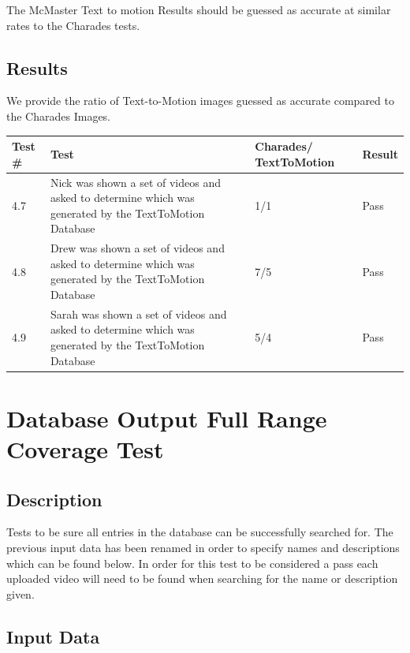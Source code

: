 \documentclass{scrreprt}
\begin{document}
The McMaster Text to motion Results should be guessed as accurate at similar
rates to the Charades tests.

\subsection{Results}

We provide the ratio of Text-to-Motion images guessed as accurate compared to the Charades Images.

\begin{table}[H]
        \centering
        \begin{tabular}{||p{0.75cm}|p{7.5cm}|p{2.5cm}|p{2.5cm}||}
                \hline
                \textbf Test \# & \textbf Test & \textbf Charades/ TextToMotion & \textbf Result\\
                \hline\hline
                4.7 & Nick was shown a set of videos and asked to determine which was generated by the TextToMotion Database &  1/1 & Pass\\
                \hline
                4.8 & Drew was shown a set of videos and asked to determine which was generated by the TextToMotion Database&  7/5  & Pass\\
                \hline
                4.9 & Sarah was shown a set of videos and asked to determine which was generated by the TextToMotion Database& 5/4 & Pass\\
                \hline
        \end{tabular}
\end{table}

\section{Database Output Full Range Coverage Test}
\subsection{Description}

Tests to be sure all entries in the database can be successfully searched for. The previous input data has been renamed in order to specify names and descriptions which can be found below. In order for this test to be considered a pass each uploaded video will need to be found when searching for the name or description given.

\subsection{Input Data}
\end{document}

